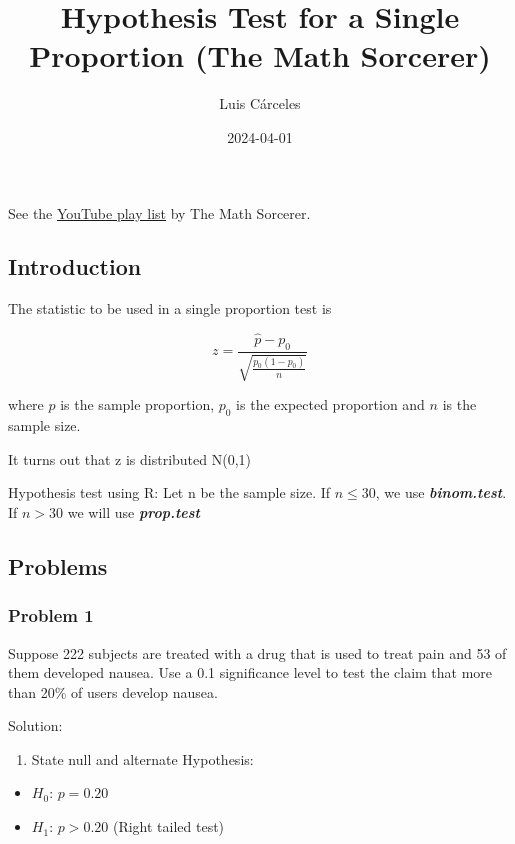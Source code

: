 \documentclass[
]{article}
\title{Hypothesis Test for a Single Proportion (The Math Sorcerer)}
\author{Luis Cárceles}
\date{2024-04-01}
\providecommand{\tightlist}{%
  \setlength{\itemsep}{0pt}\setlength{\parskip}{0pt}}
\begin{document}
\maketitle

See the
\href{https://www.youtube.com/playlist?list=PLO1y6V1SXjjMIJ7HK2U7qFvoLpnNQfbuF}{YouTube
play list} by The Math Sorcerer.

\hypertarget{introduction}{%
\subsection{Introduction}\label{introduction}}

The statistic to be used in a single proportion test is

\[z=\frac{\hat{p}-p_{0}}{\sqrt{\frac{p_{0}(1-p_{0})}{n}}}\]

where \(\hat{p}\) is the sample proportion, \(p_{0}\) is the expected
proportion and \(n\) is the sample size.

It turns out that z is distributed N(0,1)

Hypothesis test using R: Let n be the sample size. If \(n\leq30\), we
use \textbf{\emph{binom.test}}. If \(n>30\) we will use
\textbf{\emph{prop.test}}

\hypertarget{problems}{%
\subsection{Problems}\label{problems}}

\hypertarget{problem-1}{%
\subsubsection{Problem 1}\label{problem-1}}

Suppose 222 subjects are treated with a drug that is used to treat pain
and 53 of them developed nausea. Use a 0.1 significance level to test
the claim that more than 20\% of users develop nausea.

Solution:

\begin{enumerate}
\def\labelenumi{\arabic{enumi}.}
\tightlist
\item
  State null and alternate Hypothesis:
\end{enumerate}

\begin{itemize}
\tightlist
\item
  \(H_{0}\): \(p=0.20\)
\item
  \(H_{1}\): \(p>0.20\) (Right tailed test)
\end{itemize}
\end{document}
